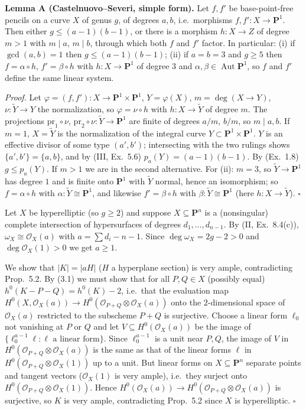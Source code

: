 \documentclass[11pt]{article}
\begin{document}
\medskip
\noindent\textbf{Lemma A (Castelnuovo--Severi, simple form).} Let $f,f'$ be base-point-free pencils on a curve $X$ of genus $g$, of degrees $a,b$, i.e.\ morphisms $f,f':X\to\mathbf P^1$. Then either $g\le(a-1)(b-1)$, or there is a morphism $h:X\to Z$ of degree $m>1$ with $m\mid a$, $m\mid b$, through which both $f$ and $f'$ factor. In particular: (i) if $\gcd(a,b)=1$ then $g\le (a-1)(b-1)$; (ii) if $a=b=3$ and $g\ge5$ then $f=\alpha\circ h$, $f'=\beta\circ h$ with $h:X\to\mathbf P^1$ of degree $3$ and $\alpha,\beta\in\operatorname{Aut}\mathbf P^1$, so $f$ and $f'$ define the same linear system.

\emph{Proof.} Let $\varphi=(f,f'):X\to\mathbf P^1\times\mathbf P^1$, $Y=\varphi(X)$, $m=\deg(X\to Y)$, $\nu:\tilde Y\to Y$ the normalization, so $\varphi=\nu\circ h$ with $h:X\to\tilde Y$ of degree $m$. The projections $\mathrm{pr}_1\circ\nu$, $\mathrm{pr}_2\circ\nu:\tilde Y\to\mathbf P^1$ are finite of degrees $a/m$, $b/m$, so $m\mid a,b$. If $m=1$, $X=\tilde Y$ is the normalization of the integral curve $Y\subset\mathbf P^1\times\mathbf P^1$. $Y$ is an effective divisor of some type $(a',b')$; intersecting with the two rulings shows $\{a',b'\}=\{a,b\}$, and by (III, Ex.~5.6) $p_a(Y)=(a-1)(b-1)$. By (Ex.~1.8) $g\le p_a(Y)$. If $m>1$ we are in the second alternative. For (ii): $m=3$, so $\tilde Y\to\mathbf P^1$ has degree $1$ and is finite onto $\mathbf P^1$ with $\tilde Y$ normal, hence an isomorphism; so $f=\alpha\circ h$ with $\alpha:\tilde Y\cong\mathbf P^1$, and likewise $f'=\beta\circ h$ with $\beta:\tilde Y\cong\mathbf P^1$ (here $h:X\to\tilde Y$). \hfill$\square$

\pf
Let $X$ be hyperelliptic (so $g\ge2$) and suppose $X\subseteq\mathbf P^n$ is a (nonsingular) complete intersection of hypersurfaces of degrees $d_1,\dots,d_{n-1}$. By (II, Ex.~8.4(c)), $\omega_X\cong\mathcal O_X(a)$ with $a=\sum d_i-n-1$. Since $\deg\omega_X=2g-2>0$ and $\deg\mathcal O_X(1)>0$ we get $a\ge1$.

We show that $|K|=|aH|$ ($H$ a hyperplane section) is very ample, contradicting Prop.~5.2. By (3.1) we must show that for all $P,Q\in X$ (possibly equal) $h^0(K-P-Q)=h^0(K)-2$, i.e.\ that the evaluation map $H^0(X,\mathcal O_X(a))\to H^0(\mathcal O_{P+Q}\otimes\mathcal O_X(a))$ onto the $2$-dimensional space of $\mathcal O_X(a)$ restricted to the subscheme $P+Q$ is surjective. Choose a linear form $\ell_0$ not vanishing at $P$ or $Q$ and let $V\subseteq H^0(\mathcal O_X(a))$ be the image of $\{\ell_0^{a-1}\ell:\ell\text{ a linear form}\}$. Since $\ell_0^{a-1}$ is a unit near $P,Q$, the image of $V$ in $H^0(\mathcal O_{P+Q}\otimes\mathcal O_X(a))$ is the same as that of the linear forms $\ell$ in $H^0(\mathcal O_{P+Q}\otimes\mathcal O_X(1))$ up to a unit. But linear forms on $X\subseteq\mathbf P^n$ separate points and tangent vectors ($\mathcal O_X(1)$ is very ample), i.e.\ they surject onto $H^0(\mathcal O_{P+Q}\otimes\mathcal O_X(1))$. Hence $H^0(\mathcal O_X(a))\to H^0(\mathcal O_{P+Q}\otimes\mathcal O_X(a))$ is surjective, so $K$ is very ample, contradicting Prop.~5.2 since $X$ is hyperelliptic. \hfill$\square$
\end{document}
